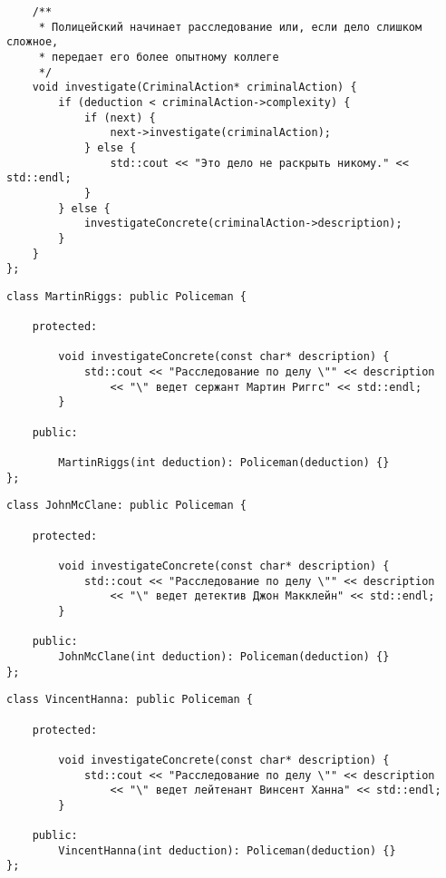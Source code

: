 \documentclass{beamer}
\begin{document}
\begin{frame}[fragile]
\begin{verbatim}
	/**
	 * Полицейский начинает расследование или, если дело слишком сложное,
	 * передает его более опытному коллеге
	 */
	void investigate(CriminalAction* criminalAction) {
		if (deduction < criminalAction->complexity) {
			if (next) {
				next->investigate(criminalAction);
			} else {
				std::cout << "Это дело не раскрыть никому." << std::endl;
			}
		} else {
			investigateConcrete(criminalAction->description);
		}
	}
};
\end{verbatim}
\pause
\begin{verbatim}
class MartinRiggs: public Policeman {

	protected:

		void investigateConcrete(const char* description) {
			std::cout << "Расследование по делу \"" << description
				<< "\" ведет сержант Мартин Риггс" << std::endl;
		}

	public:

		MartinRiggs(int deduction): Policeman(deduction) {}
};
\end{verbatim}
\end{frame}

\begin{frame}[fragile]
\begin{verbatim}
class JohnMcClane: public Policeman {

	protected:

		void investigateConcrete(const char* description) {
			std::cout << "Расследование по делу \"" << description
				<< "\" ведет детектив Джон Макклейн" << std::endl;
		}

	public:
		JohnMcClane(int deduction): Policeman(deduction) {}
};
\end{verbatim}
\pause
\begin{verbatim}
class VincentHanna: public Policeman {

	protected:

		void investigateConcrete(const char* description) {
			std::cout << "Расследование по делу \"" << description
				<< "\" ведет лейтенант Винсент Ханна" << std::endl;
		}

	public:
		VincentHanna(int deduction): Policeman(deduction) {}
};
\end{verbatim}
\end{frame}
\end{document}
